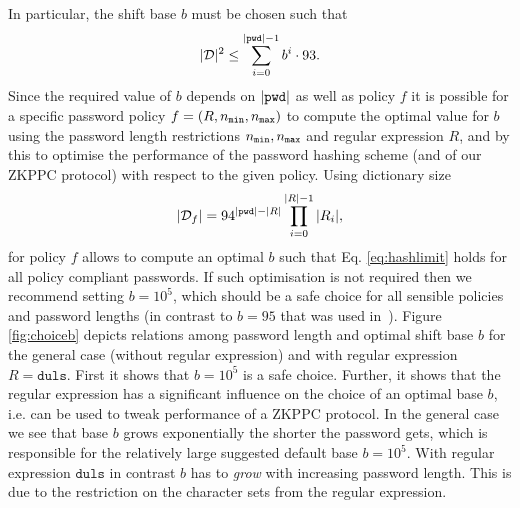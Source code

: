 In particular, the shift base $b$ must be chosen such that 
\begin{equation}\label{eq:hashlimit}
  |\mathcal{D}|^2\leq \sum_{i=0}^{|\mathtt{pwd}|-1}b^i\cdot 93.
\end{equation}
Since the required value of $b$ depends on $|\mathtt{pwd}|$ as well as policy $f$ it is possible for a specific password policy $f=(R,{n_\mathtt{min}},{n_\mathtt{max}})$ to compute the optimal value for $b$ using the password length restrictions ${n_\mathtt{min}},{n_\mathtt{max}}$ and regular expression $R$, and by this to optimise the performance of the password hashing scheme (and of our ZKPPC protocol) with respect to the given policy. 
Using dictionary size 
\[|\mathcal{D}_f|=94^{|\mathtt{pwd}|-|R|}\prod_{i=0}^{|R|-1}|R_i|,\]
for policy $f$ allows to compute an optimal $b$ such that Eq. \ref{eq:hashlimit} holds for all policy compliant passwords.
If such optimisation is not required then we recommend setting $b=10^5$, which should be a safe choice for all sensible policies and password lengths (in contrast to $b=95$ that was used in~\cite{KieferM14b}).
Figure \ref{fig:choiceb} depicts relations among password length and optimal shift base $b$ for the general case (without regular expression) and with regular expression $R=\mathtt{duls}$.
First it shows that $b=10^5$ is a safe choice.
Further, it shows that the regular expression has a significant influence on the choice of an optimal base $b$, i.e. can be used to tweak performance of a ZKPPC protocol.
In the general case we see that base $b$ grows exponentially the shorter the password gets, which is responsible for the relatively large suggested default base $b=10^5$.
With regular expression $\mathtt{duls}$ in contrast $b$ has to \emph{grow} with increasing password length.
This is due to the restriction on the character sets from the regular expression.


